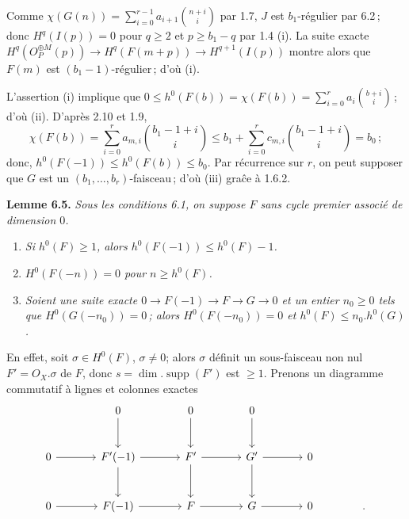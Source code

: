 
Comme \(\chi(G(n))=\sum_{i=0}^{r-1} a_{i+1}\binom{n+i}{i}\) par 1.7, $J$ est $b_1$-r\'egulier par 6.2\,; donc \(H^q(I(p))=0\) pour $q\ge2$ et $p\ge b_1-q$ par 1.4 (i). La suite exacte \(H^q({O}_P^{\oplus M}(p))\longrightarrow H^q(F(m+p))\longrightarrow H^{q+1}(I(p))\) montre alors que $F(m)$ est $(b_1-1)$-r\'egulier\,; d'o\`u (i).

L'assertion (i) implique que \(0\le h^0(F(b))=\chi(F(b))=\sum_{i=0}^{r}a_i\binom{b+i}{i}\)\,; d'o\`u (ii). D'apr\`es 2.10 et 1.9,
\[
   \chi(F(b))=\sum_{i=0}^{r} a_{m,i}\binom{b_1-1+i}{i}\le b_1+\sum_{i=0}^{r} c_{m,i}\binom{b_1-1+i}{i}=b_0\,;
\]
donc, $h^0(F(-1))\le h^0(F(b))\le b_0$. Par r\'ecurrence sur $r$, on peut supposer que $G$ est un $(b_1,\ldots,b_r)$-faisceau\,; d'o\`u (iii) gra\^ce \`a 1.6.2.

\textbf{Lemme 6.5.} \emph{Sous les conditions 6.1, on suppose $F$ sans cycle premier associ\'e de dimension $0$.}
\begin{enumerate}[label=(\roman*)]
\item \emph{Si $h^0(F)\ge1$, alors $h^0(F(-1))\le h^0(F)-1$.}
\item \emph{$H^0(F(-n))=0$ pour $n\ge h^0(F)$.}
\item \emph{Soient une suite exacte $0\to F(-1)\to F\to G\to0$ et un entier $n_0\ge0$ tels que $H^0(G(-n_0))=0$\,; alors $H^0(F(-n_0))=0$ et $h^0(F)\le n_0.h^0(G)$.}
\end{enumerate}
En effet, soit $\sigma\in H^0(F)$, $\sigma\ne0$; alors $\sigma$ d\'efinit un sous-faisceau non nul $F'={O}_X.\sigma$ de $F$, donc $s=\dim.\operatorname{supp}(F')$ est $\ge1$. Prenons un diagramme commutatif \`a lignes et colonnes exactes
\[
\begin{tikzcd}[column sep=large,row sep=large]
&0 \arrow[d]&0 \arrow[d]&0 \arrow[d]&\\
0 \arrow[r]&F'(-1) \arrow[r] \arrow[d]&F' \arrow[r] \arrow[d]&G' \arrow[r] \arrow[d]&0\\
0 \arrow[r]&F(-1) \arrow[r]&F \arrow[r]&G \arrow[r]&0 & .
\end{tikzcd}
\]
